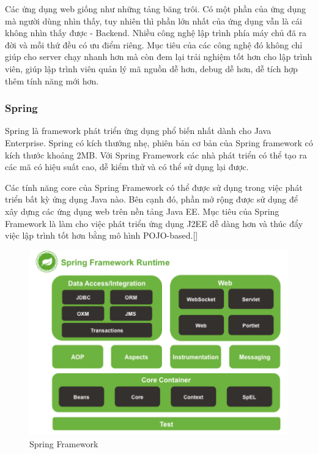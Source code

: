 Các ứng dụng web giống như những tảng băng trôi. Có một phần của ứng dụng mà người dùng nhìn thấy, tuy nhiên thì phần lớn nhất của ứng dụng vẫn là cái không nhìn thấy được - Backend. Nhiều công nghệ lập trình phía máy chủ đã ra đời và mỗi thứ đều có ưu điểm riêng. Mục tiêu của các công nghệ đó không chỉ giúp cho server chạy nhanh hơn mà còn đem lại trải nghiệm tốt hơn cho lập trình viên, giúp lập trình viên quản lý mã nguồn dễ hơn, debug dễ hơn, dễ tích hợp thêm tính năng mới hơn.
\subsubsection{Spring}
Spring là framework phát triển ứng dụng phổ biến nhất dành cho Java Enterprise. Spring có kích thướng nhẹ, phiên bản cơ bản của Spring framework có kích thước khoảng 2MB. Với Spring Framework các nhà phát triển có thể tạo ra các mã có hiệu suất cao, dễ kiểm thử và có thể sử dụng lại được.\par
Các tính năng core của Spring Framework có thể được sử dụng trong việc phát triển bất kỳ ứng dụng Java nào. Bên cạnh đó, phần mở rộng được sử dụng để xây dựng các ứng dụng web trên nền tảng Java EE. Mục tiêu của Spring Framework là làm cho việc phát triển ứng dụng J2EE dễ dàng hơn và thúc đẩy việc lập trình tốt hơn bằng mô hình POJO-based.[\cite{java_spring_boot}]
\begin{figure}[H]
    \begin{center}
        \includegraphics[width=12cm]{Image/Technical/spring_framework.png}
        \caption{Spring Framework}
        \label{spring}
    \end{center}
\end{figure}

